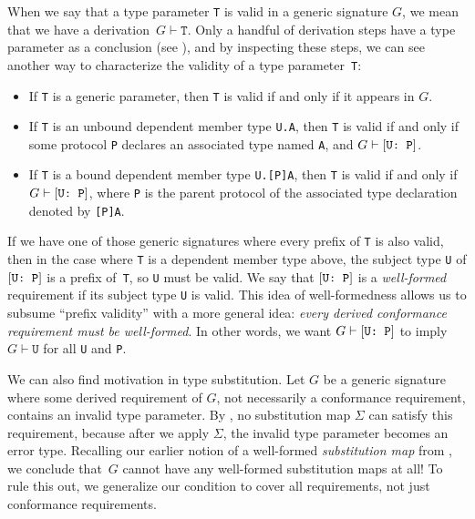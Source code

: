 \documentclass[../generics]{subfiles}
\begin{document}
When we say that a type parameter \texttt{T} is valid in a generic signature $G$, we mean that we have a derivation~$G\vdash\texttt{T}$. Only a handful of derivation steps have a type parameter as a conclusion (see ), and by inspecting these steps, we can see another way to characterize the validity of a type parameter~\texttt{T}:
\begin{itemize}
\item If \texttt{T} is a generic parameter, then \texttt{T} is valid if and only if it appears in $G$.
\item If \texttt{T} is an unbound dependent member type \texttt{U.A}, then \texttt{T} is valid if and only if some protocol \texttt{P} declares an associated type named \texttt{A}, and $G\vdash[\texttt{U:~P}]$.
\item If \texttt{T} is a bound dependent member type \texttt{U.[P]A}, then \texttt{T} is valid if and only if $G\vdash[\texttt{U:~P}]$, where \texttt{P} is the parent protocol of the associated type declaration denoted by \texttt{[P]A}.
\end{itemize}

If we have one of those generic signatures where every prefix of \texttt{T} is also valid, then in the case where \texttt{T} is a dependent member type above, the subject type \texttt{U} of $[\texttt{U:~P}]$ is a prefix of~\texttt{T}, so \texttt{U} must be valid. We say that $[\texttt{U:~P}]$ is a \emph{well-formed} requirement if its subject type \texttt{U} is valid. This idea of well-formedness allows us to subsume ``prefix validity'' with a more general idea: \textsl{every derived conformance requirement must be well-formed}. In other words, we want $G\vdash[\texttt{U:~P}]$ to imply $G\vdash\texttt{U}$ for all \texttt{U} and \texttt{P}.

We can also find motivation in type substitution. Let $G$ be a generic signature where some derived requirement of $G$, not necessarily a conformance requirement, contains an invalid type parameter. By , no substitution map $\Sigma$ can satisfy this requirement, because after we apply $\Sigma$, the invalid type parameter becomes an error type. Recalling our earlier notion of a well-formed \emph{substitution map} from , we conclude that~$G$ cannot have any well-formed substitution maps at all! To rule this out, we generalize our condition to cover all requirements, not just conformance requirements.
\end{document}
